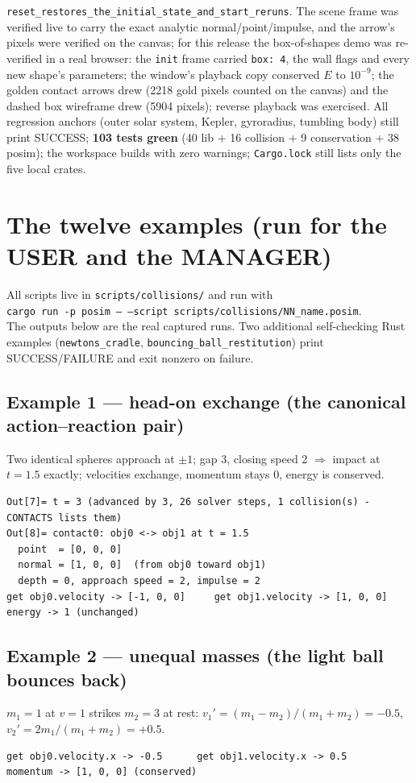 \documentclass[11pt]{article}
\newcommand{\code}[1]{\texttt{#1}}
\begin{document}
\code{reset\_restores\_the\_initial\_state\_and\_start\_reruns}. The scene
frame was verified
live to carry the exact analytic normal/point/impulse, and the arrow's
pixels were verified on the canvas; for this release the box-of-shapes demo
was re-verified in a real browser: the \code{init} frame carried
\code{box: 4}, the wall flags and every new shape's parameters; the window's
playback copy conserved $E$ to $10^{-9}$; the golden contact arrows drew
(2218 gold pixels counted on the canvas) and the dashed box wireframe drew
(5904 pixels); reverse playback was exercised. All regression anchors (outer
solar system, Kepler, gyroradius, tumbling body) still print SUCCESS;
\textbf{103 tests green} (40 lib + 16 collision + 9 conservation +
38 posim); the workspace builds with zero warnings; \code{Cargo.lock} still
lists only the five local crates.

\section{The twelve examples (run for the USER and the MANAGER)}

All scripts live in \code{scripts/collisions/} and run with\\
\code{cargo run -p posim -- --script scripts/collisions/NN\_name.posim}.\\
The outputs below are the real captured runs. Two additional self-checking Rust
examples (\code{newtons\_cradle}, \code{bouncing\_ball\_restitution}) print
SUCCESS/FAILURE and exit nonzero on failure.

\subsection{Example 1 --- head-on exchange (the canonical action--reaction pair)}
Two identical spheres approach at $\pm 1$; gap 3, closing speed 2 $\Rightarrow$
impact at $t = 1.5$ exactly; velocities exchange, momentum stays 0, energy is
conserved.
\begin{lstlisting}
Out[7]= t = 3 (advanced by 3, 26 solver steps, 1 collision(s) - CONTACTS lists them)
Out[8]= contact0: obj0 <-> obj1 at t = 1.5
  point  = [0, 0, 0]
  normal = [1, 0, 0]  (from obj0 toward obj1)
  depth = 0, approach speed = 2, impulse = 2
get obj0.velocity -> [-1, 0, 0]     get obj1.velocity -> [1, 0, 0]
energy -> 1 (unchanged)
\end{lstlisting}

\subsection{Example 2 --- unequal masses (the light ball bounces back)}
$m_1 = 1$ at $v = 1$ strikes $m_2 = 3$ at rest:
$v_1' = (m_1{-}m_2)/(m_1{+}m_2) = -0.5$,
$v_2' = 2m_1/(m_1{+}m_2) = +0.5$.
\begin{lstlisting}
get obj0.velocity.x -> -0.5      get obj1.velocity.x -> 0.5
momentum -> [1, 0, 0] (conserved)
\end{lstlisting}
\end{document}
